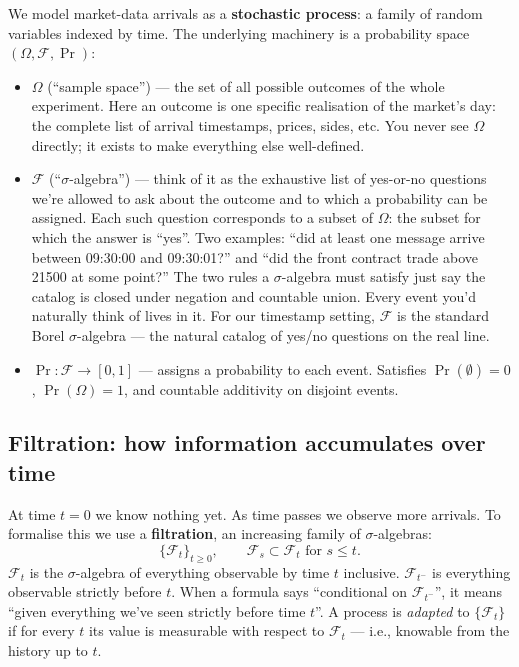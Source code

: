 We model market-data arrivals as a \textbf{stochastic process}: a family of random variables indexed by time. The underlying machinery is a probability space $(\Omega, \mathcal{F}, \Pr)$:

\begin{itemize}
    \item $\Omega$ (``sample space'') --- the set of all possible outcomes of the whole experiment. Here an outcome is one specific realisation of the market's day: the complete list of arrival timestamps, prices, sides, etc. You never see $\Omega$ directly; it exists to make everything else well-defined.
    \item $\mathcal{F}$ (``$\sigma$-algebra'') --- think of it as the exhaustive list of yes-or-no questions we're allowed to ask about the outcome and to which a probability can be assigned. Each such question corresponds to a subset of $\Omega$: the subset for which the answer is ``yes''. Two examples: ``did at least one message arrive between 09:30:00 and 09:30:01?'' and ``did the front contract trade above 21500 at some point?'' The two rules a $\sigma$-algebra must satisfy just say the catalog is closed under negation and countable union. Every event you'd naturally think of lives in it. For our timestamp setting, $\mathcal{F}$ is the standard Borel $\sigma$-algebra --- the natural catalog of yes/no questions on the real line.
    \item $\Pr : \mathcal{F} \to [0, 1]$ --- assigns a probability to each event. Satisfies $\Pr(\emptyset) = 0$, $\Pr(\Omega) = 1$, and countable additivity on disjoint events.
\end{itemize}

\subsection{Filtration: how information accumulates over time}
\label{app:pp-filtration}

At time $t = 0$ we know nothing yet. As time passes we observe more arrivals. To formalise this we use a \textbf{filtration}, an increasing family of $\sigma$-algebras:
$$\{\mathcal{F}_t\}_{t \geq 0}, \qquad \mathcal{F}_s \subset \mathcal{F}_t \text{ for } s \leq t.$$
$\mathcal{F}_t$ is the $\sigma$-algebra of everything observable by time $t$ inclusive. $\mathcal{F}_{t^-}$ is everything observable strictly before $t$. When a formula says ``conditional on $\mathcal{F}_{t^-}$'', it means ``given everything we've seen strictly before time $t$''. A process is \emph{adapted} to $\{\mathcal{F}_t\}$ if for every $t$ its value is measurable with respect to $\mathcal{F}_t$ --- i.e., knowable from the history up to $t$.

